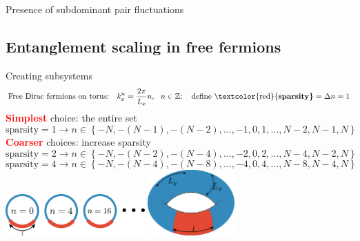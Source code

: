 \documentclass[11pt,aspectratio=169]{beamer}
\newcommand{\focus}[1]{\textcolor{red}{\bf{#1}}}
\begin{document}
\begin{frame}{Presence of subdominant pair fluctuations}
	
\end{frame}
\begin{frame}{}
\section{Entanglement scaling in free fermions}
\end{frame}

\begin{frame}{Creating subsystems}
	\[\text{Free Dirac fermions on torus:}~ ~ ~ k_x^n = \frac{2\pi }{L_x} n,~ ~ n \in \mathbb{Z};~~~ \text{define \focus{sparsity}} = \Delta n = 1\]
	\focus{Simplest} choice: the entire set
	\[\text{sparsity} = 1 \longrightarrow n \in \left\{-N,-(N-1),-(N-2),\ldots,-1,0,1,\ldots,N-2,N-1,N\right\} \]
	\focus{Coarser} choices: increase sparsity
	\[\text{sparsity} = 2 \longrightarrow n \in \left\{-N,-(N-2),-(N-4),\ldots,-2,0,2,\ldots,N-4,N-2,N\right\} \]
	\[\text{sparsity} = 4 \longrightarrow n \in \left\{-N,-(N-4),-(N-8),\ldots,-4,0,4,\ldots,N-8,N-4,N\right\} \]
	\centering
	\vspace*{\fill}
	\includegraphics[width=0.4\textwidth]{figures/A_mi.pdf}
	\hspace*{\fill}
	\includegraphics[width=0.25\textwidth]{figures/subsystem-torus.pdf}
\end{frame}
\end{document}
